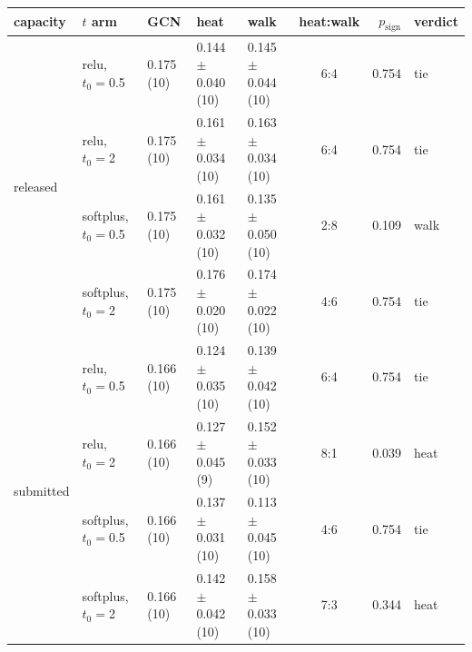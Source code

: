 {\footnotesize\setlength{\tabcolsep}{3.5pt}
\begin{tabular}{@{}lllllcrl@{}}
\toprule
capacity & $t$ arm & GCN & heat & walk & heat:walk & $p_{\mathrm{sign}}$ & verdict \\
\midrule
\multirow{4}{*}{released} & relu, $t_0{=}$0.5 & 0.175 (10) & 0.144 $\pm$ 0.040 (10) & 0.145 $\pm$ 0.044 (10) & 6:4 & 0.754 & tie \\
 & relu, $t_0{=}$2 & 0.175 (10) & 0.161 $\pm$ 0.034 (10) & 0.163 $\pm$ 0.034 (10) & 6:4 & 0.754 & tie \\
 & softplus, $t_0{=}$0.5 & 0.175 (10) & 0.161 $\pm$ 0.032 (10) & 0.135 $\pm$ 0.050 (10) & 2:8 & 0.109 & walk \\
 & softplus, $t_0{=}$2 & 0.175 (10) & 0.176 $\pm$ 0.020 (10) & 0.174 $\pm$ 0.022 (10) & 4:6 & 0.754 & tie \\
\midrule
\multirow{4}{*}{submitted} & relu, $t_0{=}$0.5 & 0.166 (10) & 0.124 $\pm$ 0.035 (10) & 0.139 $\pm$ 0.042 (10) & 6:4 & 0.754 & tie \\
 & relu, $t_0{=}$2 & 0.166 (10) & 0.127 $\pm$ 0.045 (9) & 0.152 $\pm$ 0.033 (10) & 8:1 & 0.039 & heat \\
 & softplus, $t_0{=}$0.5 & 0.166 (10) & 0.137 $\pm$ 0.031 (10) & 0.113 $\pm$ 0.045 (10) & 4:6 & 0.754 & tie \\
 & softplus, $t_0{=}$2 & 0.166 (10) & 0.142 $\pm$ 0.042 (10) & 0.158 $\pm$ 0.033 (10) & 7:3 & 0.344 & heat \\
\bottomrule
\end{tabular}
}
